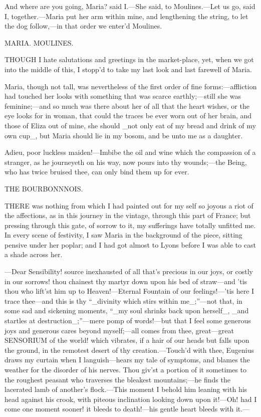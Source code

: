 \documentclass[twoside]{article}
\begin{document}
And where are you going, Maria? said I.—She said, to Moulines.—Let us go,
said I, together.—Maria put her arm within mine, and lengthening the
string, to let the dog follow,—in that order we enter’d Moulines.




MARIA.
MOULINES.


THOUGH I hate salutations and greetings in the market-place, yet, when we
got into the middle of this, I stopp’d to take my last look and last
farewell of Maria.

Maria, though not tall, was nevertheless of the first order of fine
forms:—affliction had touched her looks with something that was scarce
earthly;—still she was feminine;—and so much was there about her of all
that the heart wishes, or the eye looks for in woman, that could the
traces be ever worn out of her brain, and those of Eliza out of mine, she
should _not only eat of my bread and drink of my own cup_, but Maria
should lie in my bosom, and be unto me as a daughter.

Adieu, poor luckless maiden!—Imbibe the oil and wine which the compassion
of a stranger, as he journeyeth on his way, now pours into thy
wounds;—the Being, who has twice bruised thee, can only bind them up for
ever.




THE BOURBONNNOIS.


THERE was nothing from which I had painted out for my self so joyous a
riot of the affections, as in this journey in the vintage, through this
part of France; but pressing through this gate, of sorrow to it, my
sufferings have totally unfitted me.  In every scene of festivity, I saw
Maria in the background of the piece, sitting pensive under her poplar;
and I had got almost to Lyons before I was able to cast a shade across
her.

—Dear Sensibility! source inexhausted of all that’s precious in our joys,
or costly in our sorrows! thou chainest thy martyr down upon his bed of
straw—and ’tis thou who lift’st him up to Heaven!—Eternal Fountain of our
feelings!—’tis here I trace thee—and this is thy “_divinity which stirs
within me_;”—not that, in some sad and sickening moments, “_my soul
shrinks back upon herself_, _and startles at destruction_;”—mere pomp of
words!—but that I feel some generous joys and generous cares beyond
myself;—all comes from thee, great—great SENSORIUM of the world! which
vibrates, if a hair of our heads but falls upon the ground, in the
remotest desert of thy creation.—Touch’d with thee, Eugenius draws my
curtain when I languish—hears my tale of symptoms, and blames the weather
for the disorder of his nerves.  Thou giv’st a portion of it sometimes to
the roughest peasant who traverses the bleakest mountains;—he finds the
lacerated lamb of another’s flock.—This moment I behold him leaning with
his head against his crook, with piteous inclination looking down upon
it!—Oh! had I come one moment sooner! it bleeds to death!—his gentle
heart bleeds with it.—
\end{document}
